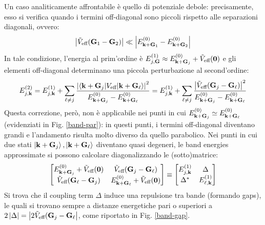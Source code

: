 Un caso analiticamente affrontabile è quello di potenziale debole: precisamente, esso si verifica quando i termini off-diagonal sono piccoli rispetto alle separazioni diagonali, ovvero:
\begin{equation}
	\left\lvert\tilde{V}_\text{eff}(\mathbf{G}_1 - \mathbf{G}_2)\right\rvert \ll \left\lvert E_{\mathbf{k} + \mathbf{G}_1}^{(0)} - E_{\mathbf{k} + \mathbf{G}_2}^{(0)}\right\rvert
\end{equation}
In tale condizione, l'energia al prim'ordine è $ E_{j,\mathbf{G}}^{(1)} \approx E_{\mathbf{k} + \mathbf{G}_j}^{(0)} + \tilde{V}_\text{eff}(\mathbf{0}) $ e gli elementi off-diagonal determinano una piccola perturbazione al second'ordine:
\begin{equation}
	E_{j,\mathbf{k}}^{(2)} = E_{j,\mathbf{k}}^{(1)} + \sum_{\ell \neq j} \frac{\left\lvert\braket{\mathbf{k} + \mathbf{G}_j | V_\text{eff} | \mathbf{k} + \mathbf{G}_\ell}\right\rvert^2}{E_{\mathbf{k} + \mathbf{G}_j}^{(0)} - E_{\mathbf{k} + \mathbf{G}_\ell}^{(0)}} = E_{j,\mathbf{k}}^{(1)} + \sum_{\ell \neq j} \frac{\left\lvert\tilde{V}_\text{eff}(\mathbf{G}_j - \mathbf{G}_\ell)\right\rvert^2}{E_{\mathbf{k} + \mathbf{G}_j}^{(0)} - E_{\mathbf{k} + \mathbf{G}_\ell}^{(0)}}
\end{equation}
Questa correzione, però, non è applicabile nei punti in cui $ E_{\mathbf{k} + \mathbf{G}_j}^{(0)} \simeq E_{\mathbf{k} + \mathbf{G}_\ell}^{(0)} $ (evidenziati in Fig. \ref{band-par}): in questi punti, i termini off-diagonal diventano grandi e l'andamento risulta molto diverso da quello parabolico. Nei punti in cui due stati $ \ket{\mathbf{k} + \mathbf{G}_j} , \ket{\mathbf{k} + \mathbf{G}_\ell} $ diventano quasi degeneri, le band energies approssimate si possono calcolare diagonalizzando le (sotto)matrice:
\begin{equation*}
	\begin{bmatrix}
		E_{\mathbf{k} + \mathbf{G}_j}^{(0)} + \tilde{V}_\text{eff}(\mathbf{0}) & \tilde{V}_\text{eff}(\mathbf{G}_j - \mathbf{G}_\ell) \\
		\tilde{V}_\text{eff}(\mathbf{G}_\ell - \mathbf{G}_j) & E_{\mathbf{k} + \mathbf{G}_\ell}^{(0)} + \tilde{V}_\text{eff}(\mathbf{0})
	\end{bmatrix}
	\equiv
	\begin{bmatrix}
		E_{j,\mathbf{k}}^{(1)} & \Delta \\
		\Delta^* & E_{\ell,\mathbf{k}}^{(1)}
	\end{bmatrix}
\end{equation*}
Si trova che il coupling term $ \Delta $ induce una repulsione tra bande (formando gaps), le quali si trovano sempre a distanze energetiche pari o superiori a $ 2\left\lvert\Delta\right\rvert = \left\lvert2\tilde{V}_\text{eff}(\mathbf{G}_j - \mathbf{G}_\ell\right\rvert $, come riportato in Fig. \ref{band-gap}.

